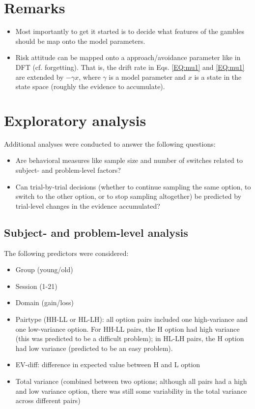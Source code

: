 \documentclass[english,doc]{apa}
\begin{document}
\section{Remarks}
\begin{itemize}
\item Most importantly to get it started is to decide what features of the gambles should be  map onto the model parameters. 
\item Risk attitude can be mapped onto a approach/avoidance parameter like in DFT (cf. forgetting). That is, the drift rate in Eqs. \ref{EQ:mu1} and \ref{EQ:mu1} are extended by $-\gamma x$, where $\gamma$ is a model parameter and $x$ is a state in the state space (roughly the evidence to accumulate). 
\end{itemize}



\section{Exploratory analysis}

Additional analyses were conducted to answer the following questions:

\begin{itemize}
\item Are behavioral measures like sample size and number of switches related to subject- and problem-level factors?
\item Can trial-by-trial decisions (whether to continue sampling the same option, to switch to the other option, or to stop sampling altogether) be predicted by trial-level changes in the evidence accumulated?
\end{itemize}


\subsection{Subject- and problem-level analysis}

The following predictors were considered:

\begin{itemize}
\item Group (young/old)
\item Session (1-21)
\item Domain (gain/loss)
\item Pairtype (HH-LL or HL-LH): all option pairs included one high-variance and one low-variance option. For HH-LL pairs, the H option had high variance (this was predicted to be a difficult problem); in HL-LH pairs, the H option had low variance (predicted to be an easy problem).
\item EV-diff: difference in expected value between H and L option
\item Total variance (combined between two options; although all pairs had a high and low variance option, there was still some variability in the total variance across different pairs)
\end{itemize}
\end{document}
